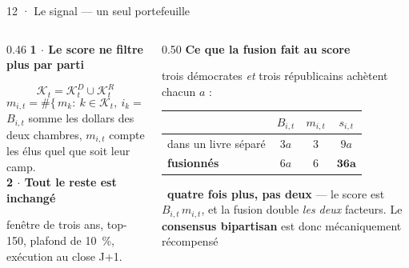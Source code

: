 \documentclass[11pt,aspectratio=169]{beamer}
\newcommand{\et}[2]{{\color{bleu}\bfseries #1 $\cdot$ #2}\par\vspace{0.6mm}}
\newcommand{\obs}[1]{{\color{bleu}\scriptsize\textbullet}~{\scriptsize #1}\par\vspace{0.4mm}}
\begin{document}
\begin{frame}{12 · Le signal --- un seul portefeuille}
  \begin{columns}[T]
    \begin{column}{0.46\textwidth}
      \et{1}{Le score ne filtre plus par parti}
      \vspace{-1mm}
      {\footnotesize\[ \mathcal K_t = \mathcal K^{D}_t \cup \mathcal K^{R}_t \]}
      \vspace{-2mm}
      {\footnotesize\[ m_{i,t} = \#\bigl\{\, m_k :\ k \in \mathcal K_t,\ i_k = i \,\bigr\} \]}
      \vspace{-1mm}
      {\scriptsize $B_{i,t}$ somme les dollars des deux chambres, $m_{i,t}$ compte les élus quel
       que soit leur camp.}\\[3mm]
      \et{2}{Tout le reste est inchangé}
      {\scriptsize fenêtre de trois ans, top-150, plafond de 10~\%, exécution au close
       J+1.}
    \end{column}
    \begin{column}{0.50\textwidth}
      {\color{bleu}\bfseries\footnotesize Ce que la fusion fait au score}\par\vspace{1.5mm}
      {\scriptsize trois démocrates \emph{et} trois républicains achètent chacun $a$ :}\par\vspace{1.5mm}
      \centering
      {\footnotesize\setlength{\tabcolsep}{8pt}\setlength{\extrarowheight}{2pt}
      \begin{tabular}{@{}l c c c@{}}
        \toprule
        & $B_{i,t}$ & $m_{i,t}$ & $s_{i,t}$\\
        \midrule
        dans un livre séparé & $3a$ & 3 & $9a$\\
        \textbf{fusionnés} & $6a$ & 6 & $\mathbf{36a}$\\
        \bottomrule
      \end{tabular}}\par\vspace{2mm}
      \raggedright
      \obs{\textbf{quatre fois plus, pas deux} --- le score est $B_{i,t}\,m_{i,t}$, et la fusion
       double \emph{les deux} facteurs. Le \textbf{consensus bipartisan} est donc mécaniquement
       récompensé}
    \end{column}
  \end{columns}
\end{frame}
\end{document}
